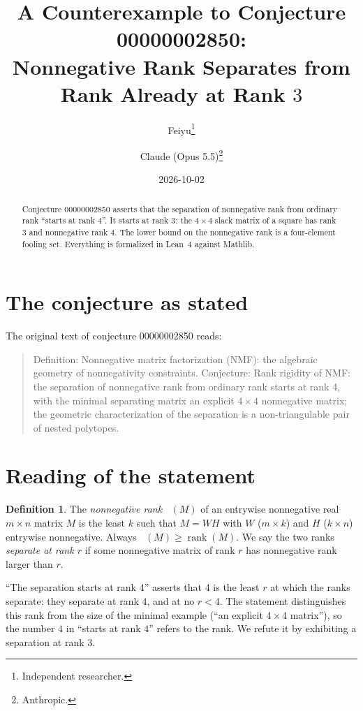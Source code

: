 \documentclass[11pt]{article}
\title{A Counterexample to Conjecture 00000002850:\\
Nonnegative Rank Separates from Rank Already at Rank $3$}
\author{%
  Feiyu\thanks{Independent researcher.}
  \and
  Claude (Opus 5.5)\thanks{Anthropic.}%
}
\date{2026-10-02}
\theoremstyle{plain}
\theoremstyle{definition}
\newtheorem{definition}[theorem]{Definition}
\theoremstyle{remark}
\DeclareMathOperator{\rank}{rank}
\DeclareMathOperator{\rankp}{rank_+}
\begin{document}
\maketitle

\begin{abstract}
Conjecture 00000002850 asserts that the separation of nonnegative rank from
ordinary rank ``starts at rank $4$''. It starts at rank $3$: the $4\times4$
slack matrix of a square has rank $3$ and nonnegative rank $4$. The lower bound
on the nonnegative rank is a four-element fooling set. Everything is formalized
in Lean~4 against Mathlib.
\end{abstract}

\section{The conjecture as stated}

The original text of conjecture 00000002850 reads:

\begin{quote}
Definition: Nonnegative matrix factorization (NMF): the algebraic geometry of
nonnegativity constraints. Conjecture: Rank rigidity of NMF: the separation of
nonnegative rank from ordinary rank starts at rank 4, with the minimal
separating matrix an explicit $4\times4$ nonnegative matrix; the geometric
characterization of the separation is a non-triangulable pair of nested
polytopes.
\end{quote}

\section{Reading of the statement}

\begin{definition}
The \emph{nonnegative rank} $\rankp(M)$ of an entrywise nonnegative real
$m\times n$ matrix $M$ is the least $k$ such that $M=WH$ with $W$ ($m\times k$)
and $H$ ($k\times n$) entrywise nonnegative. Always $\rankp(M)\ge\rank(M)$. We
say the two ranks \emph{separate at rank $r$} if some nonnegative matrix of
rank $r$ has nonnegative rank larger than $r$.
\end{definition}

``The separation starts at rank $4$'' asserts that $4$ is the least $r$ at which
the ranks separate: they separate at rank $4$, and at no $r<4$. The statement
distinguishes this rank from the size of the minimal example (``an explicit
$4\times4$ matrix''), so the number $4$ in ``starts at rank $4$'' refers to the
rank. We refute it by exhibiting a separation at rank $3$.
\end{document}
